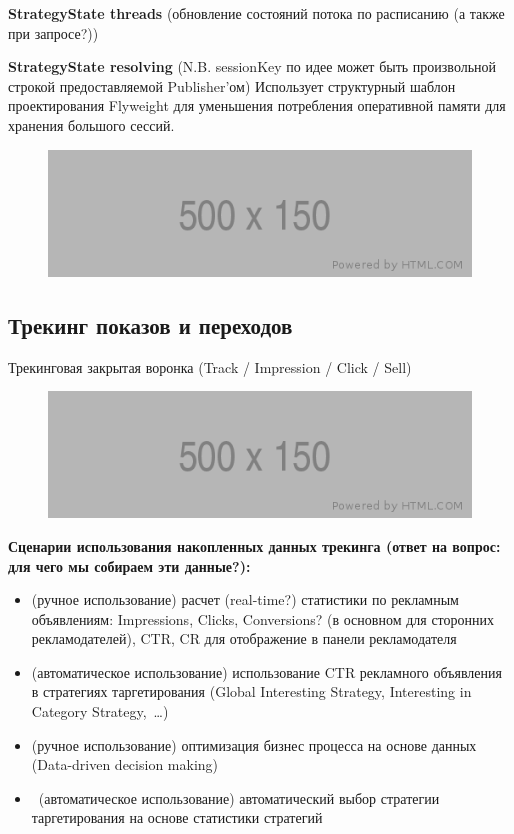 \documentclass[times]{itmo-student-thesis}
\begin{document}
\textbf{StrategyState threads} (обновление состояний потока по расписанию (а также при запросе?))

\textbf{StrategyState resolving} (N.B. sessionKey по идее может быть произвольной строкой предоставляемой Publisher'ом) Использует структурный шаблон проектирования Flyweight для уменьшения потребления оперативной памяти для хранения большого сессий.

\begin{figure}[h]
\includegraphics[width=\textwidth]{placeholder}
\centering
\end{figure}

\subsection{Трекинг показов и переходов}

Трекинговая закрытая воронка (Track / Impression / Click / Sell)

\begin{figure}[h]
\includegraphics[width=\textwidth]{placeholder}
\centering
\end{figure}

\textbf{Сценарии использования накопленных данных трекинга (ответ на вопрос: для чего мы собираем эти данные?):}
\begin{itemize}
	\item (ручное использование) расчет (real-time?) статистики по рекламным объявлениям: Impressions, Clicks, Conversions? (в основном для сторонних рекламодателей), CTR, CR для отображение в панели рекламодателя
	\item (автоматическое использование) использование CTR рекламного объявления в стратегиях таргетирования (Global Interesting Strategy, Interesting in Category Strategy, …)
	\item (ручное использование) оптимизация бизнес процесса на основе данных (Data-driven decision making)
	\item  (автоматическое использование) автоматический выбор стратегии таргетирования на основе статистики стратегий
\end{itemize}
\end{document}
